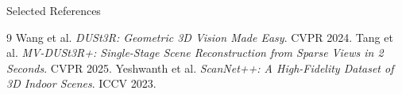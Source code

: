 \documentclass[aspectratio=169,11pt]{beamer}
\begin{document}
\begin{frame}{Selected References}
\footnotesize
\begin{thebibliography}{9}
 Wang et al. \emph{DUSt3R: Geometric 3D Vision Made Easy}. CVPR 2024.
 Tang et al. \emph{MV-DUSt3R+: Single-Stage Scene Reconstruction from Sparse Views in 2 Seconds}. CVPR 2025.
 Yeshwanth et al. \emph{ScanNet++: A High-Fidelity Dataset of 3D Indoor Scenes}. ICCV 2023.
\end{thebibliography}
\end{frame}
\end{document}
